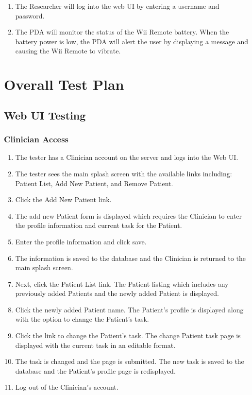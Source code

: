 \documentclass{article}
\begin{document}
\begin{enumerate}
\item The Researcher will log into the web UI by entering a username and password.

\item The PDA will monitor the status of the Wii Remote battery.  When the battery power is low, the PDA will alert the user by displaying a message and causing the Wii Remote to vibrate.
\end{enumerate}



\section{Overall Test Plan}
\subsection{Web UI Testing}
\subsubsection{Clinician Access}
\begin{enumerate}
\item The tester has a Clinician account on the server and logs into the Web UI.
\item The tester sees the main splash screen with the available links including: Patient List, Add New Patient, and Remove Patient.
\item Click the Add New Patient link.
\item The add new Patient form is displayed which requires the Clinician to enter the profile information and current task for the Patient.
\item Enter the profile information and click save.
\item The information is saved to the database and the Clinician is returned to the main splash screen.
\item Next, click the Patient List link. The Patient listing which includes any previously added Patients and the newly added Patient is displayed.
\item Click the newly added Patient name. The Patient's profile is displayed along with the option to change the Patient's task.
\item Click the link to change the Patient's task. The change Patient task page is displayed with the current task in an editable format.
\item The task is changed and the page is submitted. The new task is saved to the database and the Patient's profile page is redisplayed.
\item Log out of the Clinician's account.
\end{enumerate}
\end{document}

